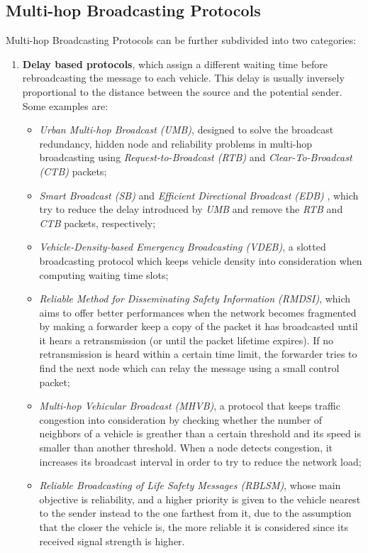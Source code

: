 	
		\subsection{Multi-hop Broadcasting Protocols}
			Multi-hop Broadcasting Protocols can be further subdivided into two categories:
			\begin{enumerate}
				\item \textbf{Delay based protocols}, which assign a different waiting time before rebroadcasting the message to each vehicle. This delay is usually inversely proportional to the distance between the source and the potential sender.
				Some examples are:
				\begin{itemize}
					\renewcommand\labelitemi{--}
					\item \textit{Urban Multi-hop Broadcast (UMB)}\cite{Korkmaz:2004:UMB:1023875.1023887}, designed to solve the broadcast redundancy, hidden node and reliability problems in multi-hop broadcasting using \textit{Request-to-Broadcast (\textit{RTB})} and \textit{Clear-To-Broadcast (\textit{CTB})} packets; 
					\item \textit{Smart Broadcast (SB)}\cite{4025102} and \textit{Efficient Directional Broadcast (EDB)} \cite{4340158}, which try to reduce the delay introduced by \textit{UMB} and remove the \textit{RTB} and \textit{CTB} packets, respectively;
					\item \textit{Vehicle-Density-based Emergency Broadcasting (VDEB)}\cite{5663803}, a slotted broadcasting protocol which keeps vehicle density into consideration when computing waiting time slots;
					\item \textit{Reliable Method for Disseminating Safety Information
						(RMDSI)}\cite{4591259}, which aims to offer better performances when the network becomes fragmented by making a forwarder keep a copy of the packet it has broadcasted until it hears a retransmission (or until the packet lifetime expires). If no retransmission is heard within a certain time limit, the forwarder tries to find the next node which can relay the message using a small control packet;
					\item \textit{Multi-hop Vehicular Broadcast (MHVB)}\cite{4068699}, a protocol that keeps traffic congestion into consideration by   checking whether the number of neighbors of a vehicle is greather than a certain threshold and its speed is smaller than another threshold. When a node detects congestion, it increases its broadcast interval in order to try to reduce the network load;
					\item \textit{Reliable Broadcasting of Life Safety Messages (RBLSM)}\cite{4458046}, whose main objective is reliability, and a higher priority is given to the vehicle nearest to the sender instead to the one farthest from it, due to the assumption that the closer the vehicle is, the more reliable it is considered since its received signal strength is higher.
				\end{itemize}
				

\end{enumerate}
